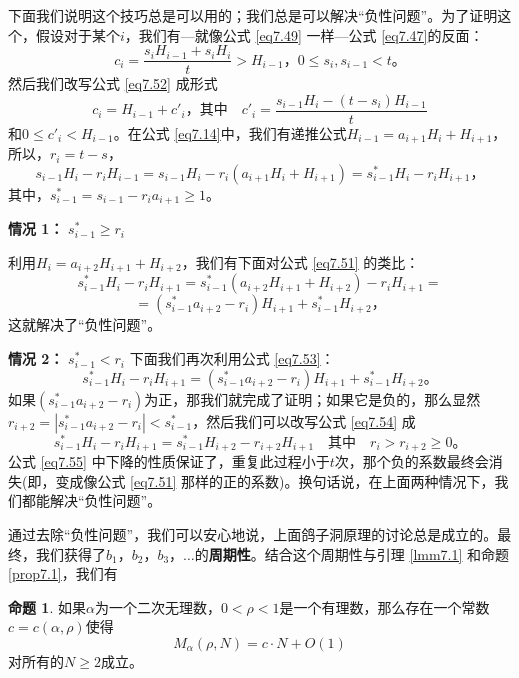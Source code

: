 \documentclass[11pt,a4paper]{article}
\theoremstyle{definition}
\newtheorem{prop}{\textbf{命题}}[section]
\newcommand{\refeq}[1]{公式 \ref{#1}}
\newcommand{\refprop}[1]{命题 \ref{#1}}
\newcommand{\reflmm}[1]{引理 \ref{#1}}
\numberwithin{equation}{section}
\newcommand{\comma}{\text{，}}
\newcommand{\juhao}{\text{。}}
\newcommand{\QEDopen}{{\setlength{\fboxsep}{0pt}\setlength{\fboxrule}{0.2pt}\fbox{\rule[0pt]{0pt}{1.3ex}\rule[0pt]{1.3ex}{0pt}}}}
\begin{document}
 下面我们说明这个技巧总是可以用的；我们总是可以解决``负性问题''。为了证明这个，假设对于某个$ i $，我们有---就像\refeq{eq7.49} 一样---\refeq{eq7.47}的反面：
 \begin{equation}\label{eq7.52}
 c_{i}=\dfrac{s_{i}H_{i-1}+s_{i}H_{i}}{t}>H_{i-1}\comma 0\leq s_{i},s_{i-1} <t\juhao
 \end{equation}
 然后我们改写\refeq{eq7.52} 成形式
 \[ c_{i}=H_{i-1}+c'_{i}\comma\text{其中}\quad  c'_{i}=\dfrac{s_{i-1}H_{i}-(t-s_{i})H_{i-1}}{t} \]
 和$ 0\leq c'_{i}<H_{i-1} $。在\refeq{eq7.14}中，我们有递推公式$ H_{i-1}=a_{i+1}H_{i}+H_{i+1} $，所以，$ r_{i}=t-s $，
 \[ s_{i-1}H_{i}-r_{i}H_{i-1}=s_{i-1}H_{i}-r_{i}\left(a_{i+1}H_{i}+H_{i+1}\right)=s_{i-1}^{\ast}H_{i}-r_{i}H_{i+1}\comma \]
 其中，$ s_{i-1}^{\ast}=s_{i-1}-r_{i}a_{i+1}\geq1 $。
 
 \textbf{情况 1：} $ s_{i-1}^{\ast}\geq r_{i} $

  \noindent 利用$ H_{i}=a_{i+2}H_{i+1}+H_{i+2} $，我们有下面对\refeq{eq7.51} 的类比：
  \[ s_{i-1}^{\ast}H_{i}-r_{i}H_{i+1}=s_{i-1}^{\ast}\left(a_{i+2}H_{i+1}+H_{i+2}\right)-r_{i}H_{i+1}= \]
  \begin{equation}\label{eq7.53}
  =\left(s_{i-1}^{\ast}a_{i+2}-r_{i}\right)H_{i+1}+s_{i-1}^{\ast}H_{i+2}\comma
  \end{equation}
  这就解决了``负性问题''。
 		
\textbf{ 情况 2：} $ s_{i-1}^{\ast}< r_{i} $
\noindent 下面我们再次利用\refeq{eq7.53}：
\begin{equation}\label{eq7.54}
s_{i-1}^{\ast}H_{i}-r_{i}H_{i+1}=\left(s_{i-1}^{\ast}a_{i+2}-r_{i}\right)H_{i+1}+s_{i-1}^{\ast}H_{i+2}\juhao
\end{equation}
如果$ \left(s_{i-1}^{\ast}a_{i+2}-r_{i}\right)  $为正，那我们就完成了证明；如果它是负的，那么显然$ r_{i+2}=\left \lvert s_{i-1}^{\ast}a_{i+2}-r_{i} \right \rvert<s_{i-1}^{\ast} $，然后我们可以改写\refeq{eq7.54} 成
\begin{equation}\label{eq7.55}
s_{i-1}^{\ast}H_{i}-r_{i}H_{i+1}=s_{i-1}^{\ast}H_{i+2}-r_{i+2}H_{i+1} \quad\text{其中}\quad r_{i}>r_{i+2}\geq0\juhao
\end{equation}
\refeq{eq7.55} 中下降的性质保证了，重复此过程小于$ t $次，那个负的系数最终会消失(即，变成像\refeq{eq7.51} 那样的正的系数)。换句话说，在上面两种情况下，我们都能解决``负性问题''。

通过去除``负性问题''，我们可以安心地说，上面鸽子洞原理的讨论总是成立的。最终，我们获得了$ b_{1}\comma b_{2}\comma b_{3}\comma\ldots$的\textbf{周期性}。结合这个周期性与\reflmm{lmm7.1} 和\refprop{prop7.1}，我们有
\begin{prop}
	如果$ \alpha $为一个二次无理数，$ 0<\rho<1 $是一个有理数，那么存在一个常数$ c=c\left(\alpha,\rho\right) $使得
	\begin{equation}\label{eq7.56}
	M_{\alpha}\left(\rho,N\right)=c\cdot N+O(1)
	\end{equation}
	对所有的$ N\geq2 $成立。\hfill\QEDopen
\end{prop}
\end{document}

